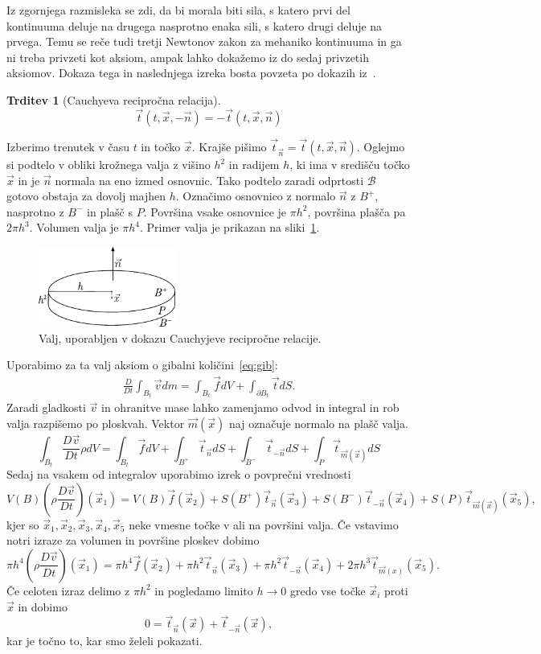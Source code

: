 \documentclass[12pt,a4paper]{article}
\theoremstyle{definition} %
\theoremstyle{plain} %
\newtheorem{trditev}[definicija]{Trditev}
\numberwithin{equation}{section}
\newcommand{\B}{\mathcal{B}}
\newcommand{\DD}[2]{\ensuremath{\frac{D #1}{D #2}}}
\newcommand{\DDt}[1]{\DD{#1}{t}}
\newcommand{\vv}{\vec{v}}
\newcommand{\vt}{\vec{t}}
\newcommand{\vn}{\vec{n}}
\newcommand{\vf}{\vec{f}}
\newcommand{\vm}{\vec{m}}
\newcommand{\vx}{\vec{x}}
\begin{document}
Iz zgornjega razmisleka se zdi, da bi morala biti sila, s katero prvi del
kontinuuma deluje na drugega nasprotno enaka sili, s katero drugi deluje na
prvega. Temu se reče tudi tretji Newtonov zakon za mehaniko kontinuuma in
ga ni treba privzeti kot aksiom, ampak lahko dokažemo iz do sedaj
privzetih aksiomov. Dokaza tega in naslednjega izreka bosta povzeta po dokazih
iz~\cite[str.\ 104--107]{hjelmstad2007fundamentals}.
\begin{trditev}[Cauchyeva recipročna relacija]
  \label{trd:cauchy-reciprocal}
  \begin{equation}
    \vt(t, \vx, -\vn) = -\vt(t, \vx, \vn)
    \label{eq:cauchy-reciprocal}
  \end{equation}
\end{trditev}
\proof
Izberimo trenutek v času $t$ in točko $\vx$. Krajše pišimo $\vt_{\vn} = \vt(t, \vx,
\vn)$. Oglejmo si podtelo v obliki krožnega valja z višino $h^2$ in radijem $h$, ki ima
v središču točko $\vx$ in je $\vn$ normala na eno izmed osnovnic.
Tako podtelo zaradi odprtosti $\B$ gotovo obstaja za dovolj majhen $h$. Označimo
osnovnico z normalo $\vn$ z $B^+$, nasprotno z $B^-$ in plašč s $P$. Površina
vsake osnovnice je $\pi h^2$, površina plašča pa $2 \pi h^3$. Volumen valja je
$\pi h^4$. Primer valja je prikazan na sliki~\ref{fig:valj}.

\begin{figure}[h]
  \centering
  \includegraphics[width=0.4\textwidth]{images/cauchy_disc.pdf}
  \caption{Valj, uporabljen v dokazu Cauchyjeve recipročne relacije.}
  \label{fig:valj}
\end{figure}

Uporabimo za ta
valj aksiom o gibalni količini~\eqref{eq:gib}:
\begin{align*}
  \DDt{} \int_{B_t} \vv dm = \int_{B_t} \vf dV + \int_{\partial B_t} \vt dS.
\end{align*}
Zaradi gladkosti $\vv$ in ohranitve mase lahko zamenjamo odvod in integral in rob valja
razpišemo po ploskvah. Vektor $\vm(\vx)$ naj označuje normalo na plašč valja.
\[
  \int_{B_t} \DDt{\vv} \rho dV = \int_{B_t} \vf dV + \int_{B^+} \vt_{\vn} dS +
  \int_{B^-}\vt_{-\vn} dS + \int_{P} \vt_{\vm(\vx)}dS
\]
Sedaj na vsakem od integralov uporabimo izrek o povprečni vrednosti
\[
  V(B) (\rho\DDt{\vv})(\vx_1) = V(B) \vf(\vx_2) + S(B^+)\vt_{\vn}(\vx_3) +
  S(B^-)\vt_{-\vn}(\vx_4) + S(P)\vt_{\vm(\vx)}(\vx_5),
\]
kjer so $\vx_1, \vx_2, \vx_3, \vx_4, \vx_5$ neke vmesne točke v ali na površini valja.
Če vstavimo notri izraze za volumen in površine ploskev dobimo
\[
  \pi h^4 (\rho \DDt{\vv})(\vx_1) = \pi h^4 \vf(\vx_2) + \pi h^2 \vt_{\vn}(\vx_3) +
  \pi h^2 \vt_{-\vn}(\vx_4) + 2 \pi h^3 \vt_{\vm(x)}(\vx_5).
\]
Če celoten izraz delimo z $\pi h^2$ in pogledamo limito $h\to 0$ gredo vse točke
$\vx_i$ proti $\vx$ in dobimo
\[
  0 = \vt_{\vn}(\vx) + \vt_{-\vn}(\vx),
\]
kar je točno to, kar smo želeli pokazati.
\endproof
\end{document}
